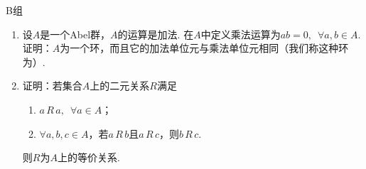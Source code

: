 \centerline{\heiti B组}
\begin{enumerate}
    \item 设$A$是一个Abel群，$A$的运算是加法. 在$A$中定义乘法运算为$ab=0,\enspace\forall a,b\in A$. 证明：$A$为一个环，而且它的加法单位元与乘法单位元相同（我们称这种环为）.

    \item 证明：若集合$A$上的二元关系$R$满足
          \begin{enumerate}
              \item $a\,R\,a,\enspace\forall a\in A$；

              \item $\forall a,b,c\in A$，若$a\,R\,b$且$a\,R\,c$，则$b\,R\,c$.
          \end{enumerate}
          则$R$为$A$上的等价关系.
\end{enumerate}

